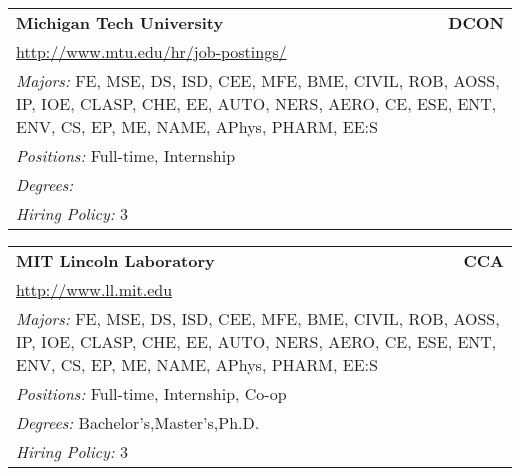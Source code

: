 \documentclass[twoside]{article}
\begin{document}
\begin{center}
\begin{multicols}{3}
\begin{FlushLeft}
\begin{minipage}{.9\columnwidth}
\end{minipage}
 
\begin{minipage}{.9\columnwidth}\begin{tabularx}{.95\columnwidth}{Xr}
                 {\Large\bf Michigan Tech University} & {\Large\bf DCON}\\
    \multicolumn{2}{p{.95\columnwidth}}{\url{http://www.mtu.edu/hr/job-postings/}}\\
    \multicolumn{2}{p{.95\columnwidth}}{\emph{Majors:} FE, MSE, DS, ISD, CEE, MFE, BME, CIVIL, ROB, AOSS, IP, IOE, CLASP, CHE, EE, AUTO, NERS, AERO, CE, ESE, ENT, ENV, CS, EP, ME, NAME, APhys, PHARM, EE:S}\\
    \multicolumn{2}{p{.95\columnwidth}}{\emph{Positions:} Full-time, Internship}\\
    \multicolumn{2}{p{.95\columnwidth}}{\emph{Degrees:} }\\
    \multicolumn{2}{p{.95\columnwidth}}{\emph{Hiring Policy:} 3}\\
    \end{tabularx}
    
\end{minipage}
 
\begin{minipage}{.9\columnwidth}\begin{tabularx}{.95\columnwidth}{Xr}
                 {\Large\bf MIT Lincoln Laboratory} & {\Large\bf CCA}\\
    \multicolumn{2}{p{.95\columnwidth}}{\url{http://www.ll.mit.edu}}\\
    \multicolumn{2}{p{.95\columnwidth}}{\emph{Majors:} FE, MSE, DS, ISD, CEE, MFE, BME, CIVIL, ROB, AOSS, IP, IOE, CLASP, CHE, EE, AUTO, NERS, AERO, CE, ESE, ENT, ENV, CS, EP, ME, NAME, APhys, PHARM, EE:S}\\
    \multicolumn{2}{p{.95\columnwidth}}{\emph{Positions:} Full-time, Internship, Co-op}\\
    \multicolumn{2}{p{.95\columnwidth}}{\emph{Degrees:} Bachelor's,Master's,Ph.D.}\\
    \multicolumn{2}{p{.95\columnwidth}}{\emph{Hiring Policy:} 3}\\
    \end{tabularx}
    
\end{minipage}
 

\end{FlushLeft}
\end{multicols}
\end{center}
\end{document}
